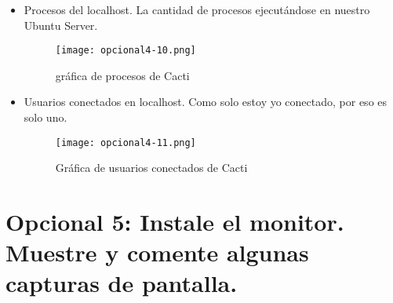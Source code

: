 \begin{itemize}
\begin{itemize}
\begin{figure}[H]
			\end{figure}
			\item Procesos del localhost. La cantidad de procesos ejecutándose en nuestro Ubuntu Server.
			\begin{figure}[H] 
				\centering
				\texttt{[image: opcional4-10.png]} 
				\label{figura2} 			
				\caption{gráfica de procesos de Cacti}
			\end{figure}
			\item Usuarios conectados en localhost. Como solo estoy yo conectado, por eso es solo uno.
			\begin{figure}[H] 
				\centering
				\texttt{[image: opcional4-11.png]} 
				\label{figura2} 			
				\caption{Gráfica de usuarios conectados de Cacti}
			\end{figure}
		\end{itemize}
	\end{itemize}
	
	\section{Opcional 5: Instale el monitor. Muestre y comente algunas capturas de pantalla.}


	 
	
	

	




